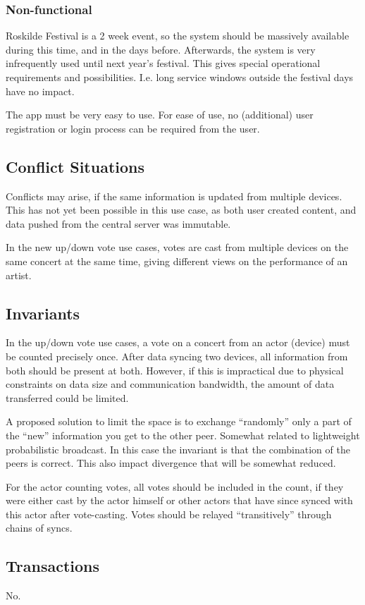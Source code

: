 \documentclass[11pt,a4paper]{report}
\begin{document}
\subsubsection{Non-functional}
Roskilde Festival is a 2 week event, so the system should be massively available during this time, and in the days before. Afterwards, the system is very infrequently used until next year's festival. This gives special operational requirements and possibilities. I.e. long service windows outside the festival days have no impact.

The app must be very easy to use. For ease of use, no (additional) user registration or login process can be required from the user. 

\subsection{Conflict Situations}
Conflicts may arise, if the same information is updated from multiple devices. This has not yet been possible in this use case, as both user created content, and data pushed from the central server was immutable.

In the new up/down vote use cases, votes are cast from multiple devices on the same concert at the same time, giving different views on the performance of an artist. 
\subsection{Invariants}
In the up/down vote use cases, a vote on a concert from an actor (device) must be counted precisely once. 
After data syncing two devices, all information from both should be present at both. 
However, if this is impractical due to physical constraints on data size and communication bandwidth, the amount of data transferred  could be limited. 

A proposed solution to limit the space is to exchange ``randomly'' only a part of the ``new'' information you get to the other peer. Somewhat related to lightweight probabilistic broadcast. In this case the invariant is that the combination of  the peers is correct. This also impact divergence that will be somewhat reduced.

For the actor counting votes, all votes should be included in the count, if they were either cast by the actor himself or other actors that have since synced with this actor after vote-casting. Votes should be relayed ``transitively'' through chains of syncs.

\subsection{Transactions}
No.
\end{document}
